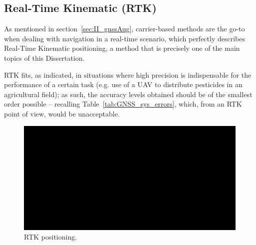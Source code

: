 


\subsection{Real-Time Kinematic (RTK)}\label{sec:II_gnssAug_rtk}

As mentioned in section~\ref{sec:II_gnssAug}, carrier-based methods are the go-to when dealing with navigation in a real-time scenario, which perfectly describes Real-Time Kinematic positioning, a method that is precisely one of the main topics of this Dissertation.

RTK fits, as indicated, in situations where high precision is indispensable for the performance of a certain task (e.g. use of a UAV to distribute pesticides in an agricultural field); as such, the accuracy levels obtained should be of the smallest order possible -- recalling Table~\ref{tab:GNSS_sys_errors}, which, from an RTK point of view, would be unacceptable.

\begin{figure}[ht]
	\centering
	\includegraphics[width=1.0\textwidth]{Chapters/Figures/demo.png}
	\caption{RTK positioning.}
	\label{fig:rtk_workings}
\end{figure}

